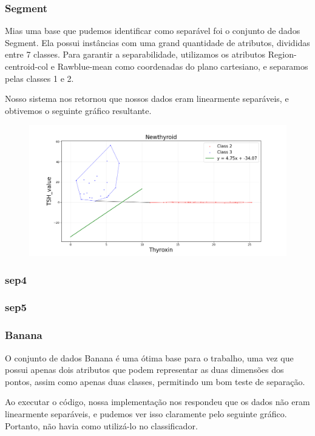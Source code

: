 \documentclass{article}
\begin{document}
\subsubsection{Segment}

Mias uma base que pudemos identificar como separável foi o conjunto de dados Segment. Ela possui instâncias com uma grand quantidade de atributos, divididas entre 7 classes. Para garantir a separabilidade, utilizamos os atributos Region-centroid-col e Rawblue-mean como coordenadas do plano cartesiano, e separamos pelas classes 1 e 2.

Nosso sistema nos retornou que nossos dados eram linearmente separáveis, e obtivemos o seguinte gráfico resultante.

\begin{figure} [H]
	\includegraphics[width=12cm]{newthyroid.png}
	\centering
\end{figure}

\subsubsection{sep4}

\subsubsection{sep5}

\subsubsection{Banana}

O conjunto de dados Banana é uma ótima base para o trabalho, uma vez que possui apenas dois atributos que podem representar as duas dimensões dos pontos, assim como apenas duas classes, permitindo um bom teste de separação.

Ao executar o código, nossa implementação nos respondeu que os dados não eram linearmente separáveis, e pudemos ver isso claramente pelo seguinte gráfico. Portanto, não havia como utilizá-lo no classificador.
\end{document}
